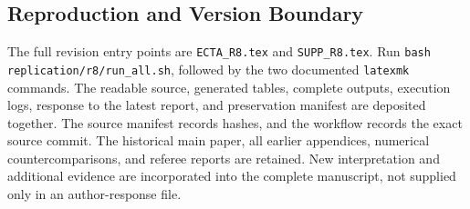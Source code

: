 \subsection{Reproduction and Version Boundary}
The full revision entry points are \texttt{ECTA\_R8.tex} and \texttt{SUPP\_R8.tex}. Run \texttt{bash replication/r8/run\_all.sh}, followed by the two documented \texttt{latexmk} commands. The readable source, generated tables, complete outputs, execution logs, response to the latest report, and preservation manifest are deposited together. The source manifest records hashes, and the workflow records the exact source commit. The historical main paper, all earlier appendices, numerical countercomparisons, and referee reports are retained. New interpretation and additional evidence are incorporated into the complete manuscript, not supplied only in an author-response file.
